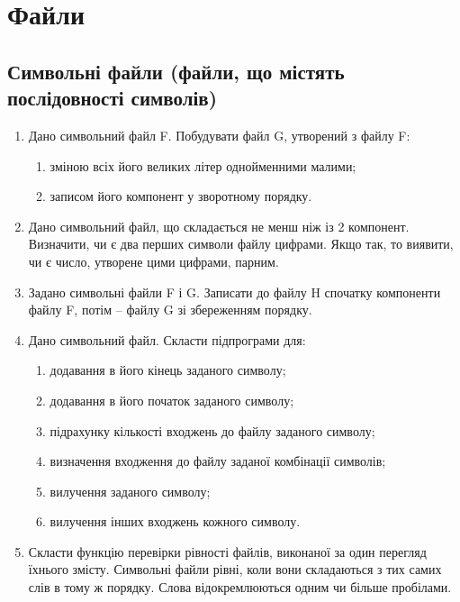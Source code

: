 \documentclass[]{article}
\makeatletter
\newcommand{\xslalph}[1]{\expandafter\@xslalph\csname c@#1\endcsname}
\newcommand{\@xslalph}[1]{%
    \ifcase#1\or а\or б\or в\or г\or д\or e\or є\or ж\or з\or i%
    \or й\or к\or л\or м\or н\or о\or п\or р\or с\or т%
    \or у\or ф\or х\or ц\or ч\or ш\or ю\or я\or аа\or бб\or вв %
    \else\@ctrerr\fi%
}
\makeatother
\begin{document}
\section{Файли}

\subsection{ Символьні файли (файли, що містять послідовності символів)}

\begin{enumerate}
\item
Дано символьний файл F. Побудувати файл G, утворений з файлу F:
\begin{enumerate}[label=\xslalph*)]
\item зміною всіх його великих літер однойменними малими;

\item  записом його компонент у зворотному порядку.
\end{enumerate}
\item
Дано символьний файл, що складається не менш ніж із 2 компонент.
Визначити, чи є два перших символи файлу цифрами. Якщо так, то виявити,
чи є число, утворене цими цифрами, парним.
\item
Задано символьні файли F і G. Записати до файлу H спочатку 
компоненти файлу F, потім -- файлу G зі збереженням порядку.

\item
Дано символьний файл. Скласти підпрограми для:
\begin{enumerate}[label=\xslalph*)]
\item
додавання в його кінець заданого символу;
\item
додавання в його початок заданого символу;
\item
підрахунку кількості входжень до файлу заданого символу;
\item
визначення входження до файлу заданої комбінації символів;
\item
вилучення заданого символу;
\item
вилучення інших входжень кожного символу.
\end{enumerate}
\item
Скласти функцію перевірки рівності файлів, виконаної за один перегляд
їхнього змісту. Символьні файли рівні, коли вони складаються з тих самих
слів в тому ж порядку. Слова відокремлюються одним чи більше пробілами.


\end{enumerate}
\end{document}
